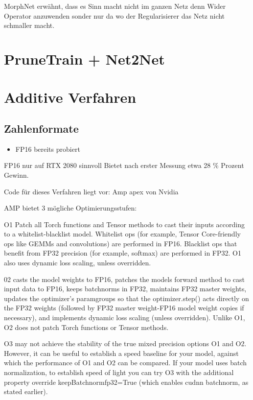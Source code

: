 MorphNet erwähnt, dass es Sinn macht nicht im ganzen Netz denn Wider Operator anzuwenden sonder nur da wo der Regularisierer das Netz nicht schmaller macht.
\section{PruneTrain + Net2Net}\label{sec:ptpnet2net}


\section{Additive Verfahren}

\subsection{Zahlenformate}
\begin{itemize}
 \item FP16 bereits probiert
\end{itemize}


FP16 nur auf RTX 2080 sinnvoll
Bietet nach erster Messung etwa 28 \% Prozent Gewinn.

Code für dieses Verfahren liegt vor: Amp apex von Nvidia

AMP bietet 3 mögliche Optimierungsstufen:

O1
Patch all Torch functions and Tensor methods to cast their inputs according to a whitelist-blacklist model. Whitelist ops (for example, Tensor Core-friendly ops like GEMMs and convolutions) are performed in FP16. Blacklist ops that benefit from FP32 precision (for example, softmax) are performed in FP32. O1 also uses dynamic loss scaling, unless overridden.

02
casts the model weights to FP16, patches the models forward method to cast input data to FP16, keeps batchnorms in FP32, maintains FP32 master weights, updates the optimizer’s paramgroups so that the optimizer.step() acts directly on the FP32 weights (followed by FP32 master weight-FP16 model weight copies if necessary), and implements dynamic loss scaling (unless overridden). Unlike O1, O2 does not patch Torch functions or Tensor methods.


O3
may not achieve the stability of the true mixed precision options O1 and O2. However, it can be useful to establish a speed baseline for your model, against which the performance of O1 and O2 can be compared. If your model uses batch normalization, to establish speed of light you can try O3 with the additional property override keepBatchnormfp32=True (which enables cudnn batchnorm, as stated earlier).

